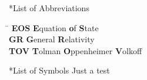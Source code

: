 \thispagestyle{empty}
\begin{section}*{List of Abbreviations}
\begin{tabbing}
\hspace{2cm}\= \kill
\textbf{EOS}        \> \textbf{E}quation \textbf{o}f \textbf{S}tate\\
\textbf{GR} 		\> \textbf{G}eneral \textbf{R}elativity \\
\textbf{TOV}		\> \textbf {T}olman \textbf{O}ppenheimer \textbf{V}olkoff

\end{tabbing}


\end{section}
\begin{section}*{List of Symbols}
	Just a test
\end{section}
